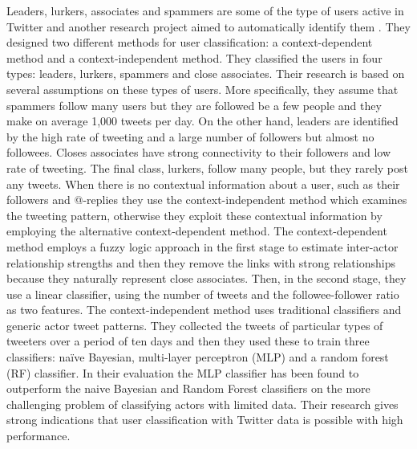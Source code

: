 Leaders, lurkers, associates and spammers are some of the type of users active in Twitter and another research project aimed to automatically identify them \cite{DBLP:journals/snam/FazeenDG11}. They designed two different methods for user classification: a context-dependent method and a context-independent method. They classified the users in four types: leaders, lurkers, spammers and close associates. Their research is based on several assumptions on these types of users. More specifically, they assume that spammers follow many users but they are followed be a few people and they make on average 1,000 tweets per day. On the other hand, leaders are identified by the high rate of tweeting and a large number of followers but almost no followees. Closes associates have strong connectivity to their followers and low rate of tweeting. The final class, lurkers, follow many people, but they rarely post any tweets. When there is no contextual information about a user, such as their followers and @-replies they use the context-independent method which examines the tweeting pattern, otherwise they exploit these contextual information by employing the alternative context-dependent method. The context-dependent method employs a fuzzy logic approach in the first stage to estimate inter-actor relationship strengths and then they remove the links with strong relationships because they naturally represent close associates. Then, in the second stage, they use a linear classifier, using the number of tweets and the followee-follower ratio as two features. The context-independent method uses traditional classifiers and generic actor tweet patterns. They collected the tweets of particular types of tweeters over a period of ten days and then they used these to train three classifiers: naïve Bayesian, multi-layer perceptron (MLP) and a random forest (RF) classifier.  In their evaluation the MLP classifier has been found to outperform the naive Bayesian and Random Forest classifiers on the more challenging problem of classifying actors with limited data. Their research gives strong indications that user classification with Twitter data is possible with high performance.\\\\

